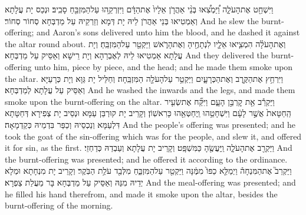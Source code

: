 {וַיִּשְׁחַ֖ט אֶת\maqqaf הָעֹלָ֑ה וַ֠יַּמְצִ֠אוּ בְּנֵ֨י אַהֲרֹ֤ן אֵלָיו֙ אֶת\maqqaf הַדָּ֔ם וַיִּזְרְקֵ֥הוּ עַל\maqqaf הַמִּזְבֵּ֖חַ סָבִֽיב׃}
{וּנְכַס יָת עֲלָתָא וְאַמְטִיאוּ בְּנֵי אַהֲרֹן לֵיהּ יָת דְּמָא וְזַרְקֵיהּ עַל מַדְבְּחָא סְחוֹר סְחוֹר׃}
{And he slew the burnt-offering; and Aaron’s sons delivered unto him the blood, and he dashed it against the altar round about.}{}
{וְאֶת\maqqaf הָעֹלָ֗ה הִמְצִ֧יאוּ אֵלָ֛יו לִנְתָחֶ֖יהָ וְאֶת\maqqaf הָרֹ֑אשׁ וַיַּקְטֵ֖ר עַל\maqqaf הַמִּזְבֵּֽחַ׃}
{וְיָת עֲלָתָא אַמְטִיאוּ לֵיהּ לְאֶבְרַהָא וְיָת רֵישָׁא וְאַסֵּיק עַל מַדְבְּחָא׃}
{And they delivered the burnt-offering unto him, piece by piece, and the head; and he made them smoke upon the altar.}{}
{וַיִּרְחַ֥ץ אֶת\maqqaf הַקֶּ֖רֶב וְאֶת\maqqaf הַכְּרָעָ֑יִם וַיַּקְטֵ֥ר עַל\maqqaf הָעֹלָ֖ה הַמִּזְבֵּֽחָה׃}
{וְחַלֵּיל יָת גַּוָּא וְיָת כְּרָעַיָּא וְאַסֵּיק עַל עֲלָתָא לְמַדְבְּחָא׃}
{And he washed the inwards and the legs, and made them smoke upon the burnt-offering on the altar.}{}
{וַיַּקְרֵ֕ב אֵ֖ת קׇרְבַּ֣ן הָעָ֑ם וַיִּקַּ֞ח אֶת\maqqaf שְׂעִ֤יר הַֽחַטָּאת֙ אֲשֶׁ֣ר לָעָ֔ם וַיִּשְׁחָטֵ֥הוּ וַֽיְחַטְּאֵ֖הוּ כָּרִאשֽׁוֹן׃}
{וְקָרֵיב יָת קוּרְבַּן עַמָּא וּנְסֵיב יָת צְפִירָא דְּחַטָּתָא דִּלְעַמָּא וְנַכְסֵיהּ וְכַפַּר בִּדְמֵיהּ כְּקַדְמָאָה׃}
{And the people’s offering was presented; and he took the goat of the sin-offering which was for the people, and slew it, and offered it for sin, as the first.}{}
{וַיַּקְרֵ֖ב אֶת\maqqaf הָעֹלָ֑ה וַֽיַּעֲשֶׂ֖הָ כַּמִּשְׁפָּֽט׃}
{וְקָרֵיב יָת עֲלָתָא וְעַבְדַהּ כְּדַחְזֵי׃}
{And the burnt-offering was presented; and he offered it according to the ordinance.}{}
{וַיַּקְרֵב֮ אֶת\maqqaf הַמִּנְחָה֒ וַיְמַלֵּ֤א כַפּוֹ֙ מִמֶּ֔נָּה וַיַּקְטֵ֖ר עַל\maqqaf הַמִּזְבֵּ֑חַ מִלְּבַ֖ד עֹלַ֥ת הַבֹּֽקֶר׃}
{וְקָרֵיב יָת מִנְחָתָא וּמְלָא יְדֵיהּ מִנַּהּ וְאַסֵּיק עַל מַדְבְּחָא בָּר מֵעֲלַת צַפְרָא׃}
{And the meal-offering was presented; and he filled his hand therefrom, and made it smoke upon the altar, besides the burnt-offering of the morning.}{}
